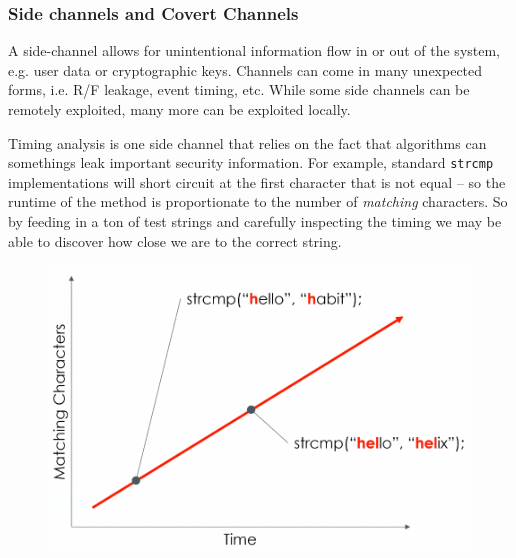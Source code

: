 \documentclass[../notes.tex]{subfiles}
\begin{document}
\subsubsection{Side channels and Covert Channels}

\begin{definition}
    A side-channel allows for unintentional information flow in or out of the system, e.g. user data or cryptographic keys.
    Channels can come in many unexpected forms, i.e. R/F leakage, event timing, etc.
    While some side channels can be remotely exploited, many more can be exploited locally.
\end{definition}

Timing analysis is one side channel that relies on the fact that algorithms can somethings leak important security information.
For example, standard \texttt{strcmp} implementations will short circuit at the first character that is not equal -- so the runtime of the method is proportionate to the number of \textit{matching} characters.
So by feeding in a ton of test strings and carefully inspecting the timing we may be able to discover how close we are to the correct string.

\begin{figure}[H]
    \centering
    \includegraphics[width=0.8\linewidth]{img/image_2023-03-28-15-37-17.png}
\end{figure}
\end{document}
